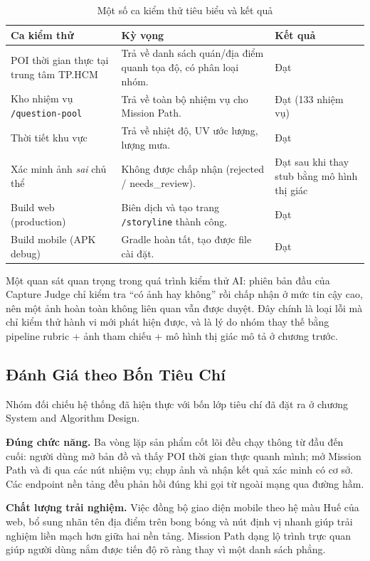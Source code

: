 \begin{table}[H]
\centering
\caption{Một số ca kiểm thử tiêu biểu và kết quả}
\label{tab:test_results}
\begin{tabularx}{\textwidth}{>{\raggedright\arraybackslash}p{4.6cm} X >{\raggedright\arraybackslash}p{2.0cm}}
\toprule
\textbf{Ca kiểm thử} & \textbf{Kỳ vọng} & \textbf{Kết quả} \\
\midrule
POI thời gian thực tại trung tâm TP.HCM & Trả về danh sách quán/địa điểm quanh tọa độ, có phân loại nhóm. & Đạt \\
Kho nhiệm vụ \texttt{/question-pool} & Trả về toàn bộ nhiệm vụ cho Mission Path. & Đạt (133 nhiệm vụ) \\
Thời tiết khu vực & Trả về nhiệt độ, UV ước lượng, lượng mưa. & Đạt \\
Xác minh ảnh \textit{sai} chủ thể & Không được chấp nhận (rejected / needs\_review). & Đạt sau khi thay stub bằng mô hình thị giác \\
Build web (production) & Biên dịch và tạo trang \texttt{/storyline} thành công. & Đạt \\
Build mobile (APK debug) & Gradle hoàn tất, tạo được file cài đặt. & Đạt \\
\bottomrule
\end{tabularx}
\end{table}

Một quan sát quan trọng trong quá trình kiểm thử AI: phiên bản đầu của
Capture Judge chỉ kiểm tra ``có ảnh hay không'' rồi chấp nhận ở mức tin
cậy cao, nên một ảnh hoàn toàn không liên quan vẫn được duyệt. Đây chính
là loại lỗi mà chỉ kiểm thử hành vi mới phát hiện được, và là lý do nhóm
thay thế bằng pipeline rubric + ảnh tham chiếu + mô hình thị giác mô tả
ở chương trước.

\subsection{Đánh Giá theo Bốn Tiêu Chí}
\contrib

Nhóm đối chiếu hệ thống đã hiện thực với bốn lớp tiêu chí đã đặt ra ở
chương System and Algorithm Design.

\textbf{Đúng chức năng.} Ba vòng lặp sản phẩm cốt lõi đều chạy thông từ
đầu đến cuối: người dùng mở bản đồ và thấy POI thời gian thực quanh mình;
mở Mission Path và đi qua các nút nhiệm vụ; chụp ảnh và nhận kết quả xác
minh có cơ sở. Các endpoint nền tảng đều phản hồi đúng khi gọi từ ngoài
mạng qua đường hầm.

\textbf{Chất lượng trải nghiệm.} Việc đồng bộ giao diện mobile theo hệ
màu Huế của web, bổ sung nhãn tên địa điểm trên bong bóng và nút định vị
nhanh giúp trải nghiệm liền mạch hơn giữa hai nền tảng. Mission Path dạng
lộ trình trực quan giúp người dùng nắm được tiến độ rõ ràng thay vì một
danh sách phẳng.

